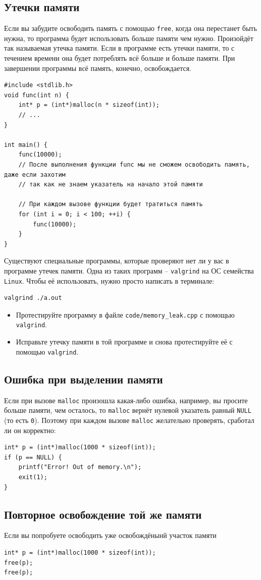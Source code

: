 \documentclass{article}
\begin{document}
\subsection*{Утечки памяти}
Если вы забудите освободить память с помощью \texttt{free}, когда она перестанет быть нужна, то программа будет использовать больше памяти чем нужно. Произойдёт так называемая утечка памяти. Если в программе есть утечки памяти, то с течением времени она будет потреблять всё больше и больше памяти. При завершении программы всё память, конечно, освобождается.
\begin{lstlisting}
#include <stdlib.h>
void func(int n) {
    int* p = (int*)malloc(n * sizeof(int));
    // ...
}

int main() {
    func(10000);
    // После выполнения функции func мы не сможем освободить память, даже если захотим
    // так как не знаем указатель на начало этой памяти
    
    // При каждом вызове функции будет тратиться память
    for (int i = 0; i < 100; ++i) {
        func(10000);
    }
}
\end{lstlisting}
Существуют специальные программы, которые проверяют нет ли у вас в программе утечек памяти. Одна из таких программ -- \texttt{valgrind} на ОС семейства \texttt{Linux}. Чтобы её использовать, нужно просто написать в терминале:
\begin{verbatim}
valgrind ./a.out
\end{verbatim}

\begin{itemize}
\item Протестируйте программу в файле \texttt{code/memory\_leak.cpp} с помощью \texttt{valgrind}.
\item Исправьте утечку памяти в той программе и снова протестируйте её с помощью \texttt{valgrind}.
\end{itemize}

\subsection*{Ошибка при выделении памяти}
Если при вызове \texttt{malloc} произошла какая-либо ошибка, например, вы просите больше памяти, чем осталось, то \texttt{malloc} вернёт нулевой указатель равный \texttt{NULL} (то есть \texttt{0}). Поэтому при каждом вызове \texttt{malloc} желательно проверять, сработал ли он корректно:
\begin{lstlisting}
int* p = (int*)malloc(1000 * sizeof(int));
if (p == NULL) {
    printf("Error! Out of memory.\n");
    exit(1);
}
\end{lstlisting}

\subsection*{Повторное освобождение той же памяти}
Если вы попробуете освободить уже освобождёнынй участок памяти
\begin{lstlisting}
int* p = (int*)malloc(1000 * sizeof(int));
free(p);
free(p);
\end{lstlisting}
\end{document}
